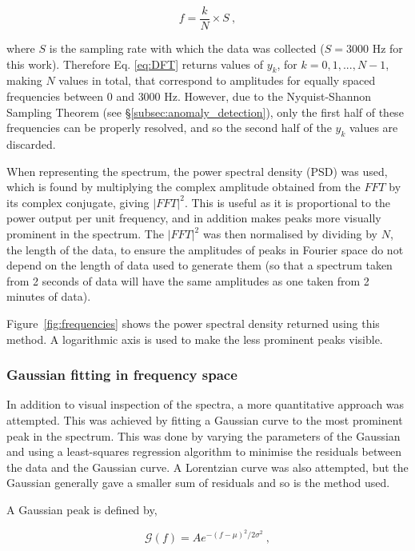 \begin{equation}
    f = \dfrac{k}{N} \times S~,
    \label{eq:freq_from_k}
\end{equation}

where $S$ is the sampling rate with which the data was collected ($S=3000$ Hz for this work). Therefore Eq. \eqref{eq:DFT} returns values of $y_k$, for $k = 0,1,...,N-1$, making $N$ values in total, that correspond to amplitudes for equally spaced frequencies between $0$ and $3000$ Hz. However, due to the Nyquist-Shannon Sampling Theorem (see \S\ref{subsec:anomaly_detection}), only the first half of these frequencies can be properly resolved, and so the second half of the $y_k$ values are discarded.

When representing the spectrum, the power spectral density (PSD) was used, which is found by multiplying the complex amplitude obtained from the $FFT$ by its complex conjugate, giving $|FFT|^2$. This is useful as it is proportional to the power output per unit frequency, and in addition makes peaks more visually prominent in the spectrum. The $|FFT|^2$ was then normalised by dividing by $N$, the length of the data, to ensure the amplitudes of peaks in Fourier space do not depend on the length of data used to generate them (so that a spectrum taken from 2 seconds of data will have the same amplitudes as one taken from 2 minutes of data).

Figure~\ref{fig:frequencies} shows the power spectral density returned using this method. A logarithmic axis is used to make the less prominent peaks visible.

\subsubsection{Gaussian fitting in frequency space}

In addition to visual inspection of the spectra, a more quantitative approach was attempted. This was achieved by fitting a Gaussian curve to the most prominent peak in the spectrum. This was done by varying the parameters of the Gaussian and using a least-squares regression algorithm to minimise the residuals between the data and the Gaussian curve. A Lorentzian curve was also attempted, but the Gaussian generally gave a smaller sum of residuals and so is the method used. 

A Gaussian peak is defined by,

\begin{equation}
   \mathcal{G}(f) = A e^{-(f-\mu)^2/2\sigma^2}~,
    \label{eq:gaussian}
\end{equation}

